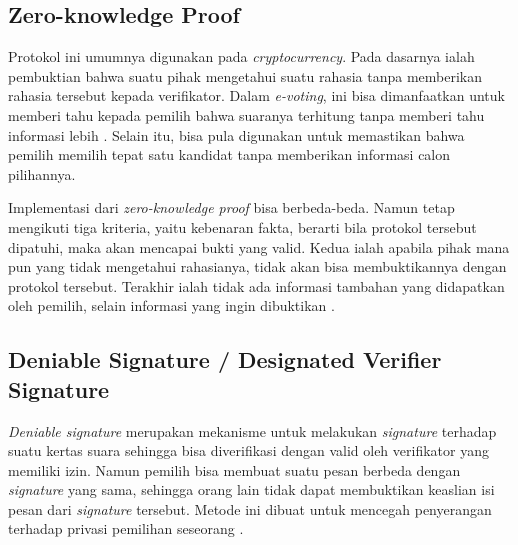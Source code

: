 \subsection{Zero-knowledge Proof}

Protokol ini umumnya digunakan pada \textit{cryptocurrency}. Pada dasarnya ialah pembuktian bahwa suatu pihak mengetahui suatu rahasia tanpa memberikan rahasia tersebut kepada verifikator. Dalam \textit{e-voting}, ini bisa dimanfaatkan untuk memberi tahu kepada pemilih bahwa suaranya terhitung tanpa memberi tahu informasi lebih \cite{zeroknow}. Selain itu, bisa pula digunakan untuk memastikan bahwa pemilih memilih tepat satu kandidat tanpa memberikan informasi calon pilihannya.

Implementasi dari \textit{zero-knowledge proof} bisa berbeda-beda. Namun tetap mengikuti tiga kriteria, yaitu kebenaran fakta, berarti bila protokol tersebut dipatuhi, maka akan mencapai bukti yang valid. Kedua ialah apabila pihak mana pun yang tidak mengetahui rahasianya, tidak akan bisa membuktikannya dengan protokol tersebut. Terakhir ialah tidak ada informasi tambahan yang didapatkan oleh pemilih, selain informasi yang ingin dibuktikan \citep{zeroknow2}. 

\subsection{Deniable Signature / Designated Verifier Signature}

\textit{Deniable signature} merupakan mekanisme untuk melakukan \textit{signature} terhadap suatu kertas suara sehingga bisa diverifikasi dengan valid oleh verifikator yang memiliki izin. Namun pemilih bisa membuat suatu pesan berbeda dengan \textit{signature} yang sama, sehingga orang lain tidak dapat membuktikan keaslian isi pesan dari \textit{signature} tersebut. Metode ini dibuat untuk mencegah penyerangan terhadap privasi pemilihan seseorang \cite{deniable}.